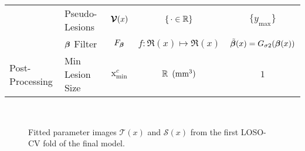 \begin{table}
\begin{tabular}{llccc}
  	                                 & Pseudo-Lesions       &         $\bm{\mathcal{V}}(x)$          &    $\{\thinspace\cdot\in\mathbb{R}\}$    &             $\{y_{\max}\}$             \\
  	                                 & $\bm{\beta}$ Filter         &         $F_{\bm{\beta}}$         & $f: \Re(x) \mapsto \Re(x)$ & $\tilde{\bm{\beta}}(x) = G_{\sigma2}(\bm{\beta}(x))$ \\ \midrule
  	\multirow{1}{*}{Post-Processing} & Min Lesion  Size     &  $\mathrm{x}_{\min}^{c}$  &  $\mathbb{R}\enspace(\text{mm}^{3})$   &                  $1$                   \\ \bottomrule
  \end{tabular}
\end{table}
\begin{figure}
  \centering
  \\[0.5em]
  \caption{Fitted parameter images $\mathcal{T}(x)$ and $\mathcal{S}(x)$
    from the first LOSO-CV fold of the final model.}%
  \label{fig:beta-final}
\end{figure}
